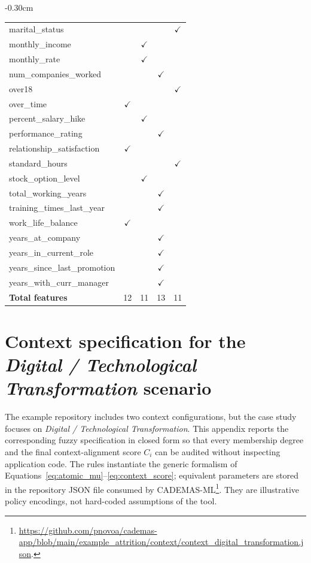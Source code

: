 \documentclass[]{article}
\newlength{\extralength}
\begin{document}
\begin{table}[h]
\begin{adjustwidth}{-0.3\extralength}{0cm}
\begin{tabularx}{1.1\textwidth}{l|cccc}
marital\_status &  &  &  & $\checkmark$ \\
monthly\_income &  & $\checkmark$ &  &  \\
monthly\_rate &  & $\checkmark$ &  &  \\
num\_companies\_worked &  &  & $\checkmark$ &  \\
over18 &  &  &  & $\checkmark$ \\
over\_time & $\checkmark$ &  &  &  \\
percent\_salary\_hike &  & $\checkmark$ &  &  \\
performance\_rating &  &  & $\checkmark$ &  \\
relationship\_satisfaction & $\checkmark$ &  &  &  \\
standard\_hours &  &  &  & $\checkmark$ \\
stock\_option\_level &  & $\checkmark$ &  &  \\
total\_working\_years &  &  & $\checkmark$ &  \\
training\_times\_last\_year &  &  & $\checkmark$ &  \\
work\_life\_balance & $\checkmark$ &  &  &  \\
years\_at\_company &  &  & $\checkmark$ &  \\
years\_in\_current\_role &  &  & $\checkmark$ &  \\
years\_since\_last\_promotion &  &  & $\checkmark$ &  \\
years\_with\_curr\_manager &  &  & $\checkmark$ &  \\
\midrule
\textbf{Total features} & 12 & 11 & 13 & 11 \\
\bottomrule
\end{tabularx}
\end{adjustwidth}
\end{table}

\section{Context specification for the \textit{Digital / Technological Transformation} scenario}\label{app:context_specs}

The example repository includes two context configurations, but the case study focuses on \textit{Digital / Technological Transformation}. This appendix reports the corresponding fuzzy specification in closed form so that every membership degree and the final context-alignment score $C_i$ can be audited without inspecting application code. The rules instantiate the generic formalism of Equations~\eqref{eq:atomic_mu}--\eqref{eq:context_score}; equivalent parameters are stored in the repository JSON file consumed by CADEMAS-ML\footnote{\url{https://github.com/pnovoa/cademas-app/blob/main/example_attrition/context/context_digital_transformation.json}.}. They are illustrative policy encodings, not hard-coded assumptions of the tool.
\end{document}
